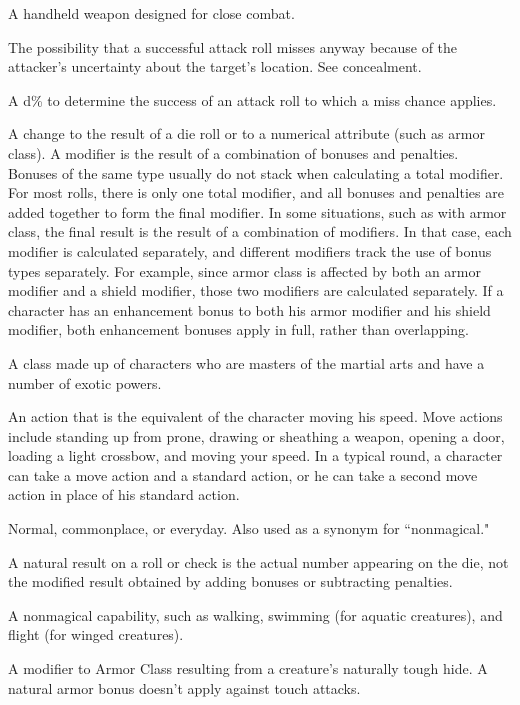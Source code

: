  A handheld weapon designed for close combat. 

 The possibility that a successful attack roll misses 
anyway because of the attacker's uncertainty about the target's 
location. See concealment. 

 A d\% to determine the success of an attack roll 
to which a miss chance applies. 

 A change to the result of a die roll or to a numerical attribute (such as armor class). A modifier is the result of a combination of bonuses and penalties. Bonuses of the same type usually do not stack when calculating a total modifier. For most rolls, there is only one total modifier, and all bonuses and penalties are added together to form the final modifier. In some situations, such as with armor class, the final result is the result of a combination of modifiers. In that case, each modifier is calculated separately, and different modifiers track the use of bonus types separately. For example, since armor class is affected by both an armor modifier and a shield modifier, those two modifiers are calculated separately. If a character has an enhancement bonus to both his armor modifier and his shield modifier, both enhancement bonuses apply in full, rather than overlapping.

 A class made up of characters who are masters of 
the martial arts and have a number of exotic powers. 

 An action that is the equivalent of the character 
moving his speed. Move actions include standing up from prone, 
drawing or sheathing a weapon, opening a door, loading a light 
crossbow, and moving your speed. In a typical round, a character can 
take a move action and a standard action, or he can take a second 
move action in place of his standard action. 

 Normal, commonplace, or everyday. Also used as a 
synonym for ``nonmagical." 

 A natural result on a roll or check is the actual number 
appearing on the die, not the modified result obtained by adding 
bonuses or subtracting penalties. 

 A nonmagical capability, such as walking, 
swimming (for aquatic creatures), and flight (for winged creatures). 

 A modifier to Armor Class resulting from a creature's naturally tough hide. A natural armor bonus doesn't apply against touch attacks. 

